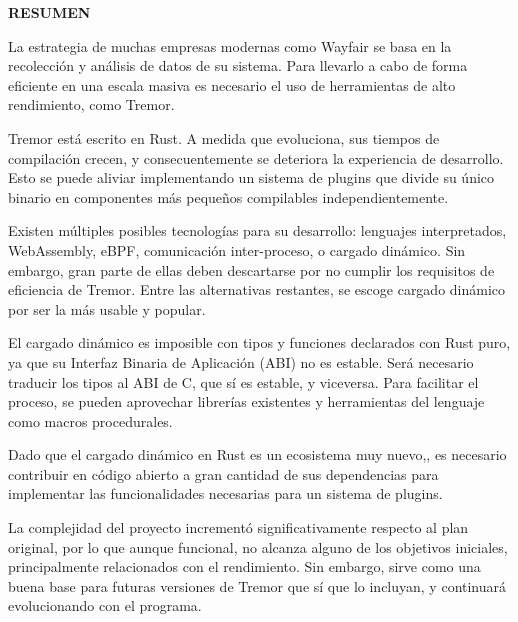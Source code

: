
\begin{center}
{\LARGE \bfseries RESUMEN}

\vspace{2.5cm}
\end{center}

La estrategia de muchas empresas modernas como Wayfair se basa en la recolección
y análisis de datos de su sistema. Para llevarlo a cabo de forma eficiente en
una escala masiva es necesario el uso de herramientas de alto rendimiento, como
Tremor.

Tremor está escrito en Rust. A medida que evoluciona, sus tiempos de compilación
crecen, y consecuentemente se deteriora la experiencia de desarrollo. Esto se
puede aliviar implementando un sistema de plugins que divide su único binario en
componentes más pequeños compilables independientemente.

Existen múltiples posibles tecnologías para su desarrollo: lenguajes
interpretados, WebAssembly, eBPF, comunicación inter-proceso, o cargado
dinámico. Sin embargo, gran parte de ellas deben descartarse por no cumplir los
requisitos de eficiencia de Tremor. Entre las alternativas restantes, se escoge
cargado dinámico por ser la más usable y popular.

El cargado dinámico es imposible con tipos y funciones declarados con Rust puro,
ya que su Interfaz Binaria de Aplicación (ABI) no es estable. Será necesario
traducir los tipos al ABI de C, que sí es estable, y viceversa. Para facilitar
el proceso, se pueden aprovechar librerías existentes y herramientas del
lenguaje como macros procedurales.

Dado que el cargado dinámico en Rust es un ecosistema muy nuevo,, es necesario
contribuir en código abierto a gran cantidad de sus dependencias para
implementar las funcionalidades necesarias para un sistema de plugins.

La complejidad del proyecto incrementó significativamente respecto al plan
original, por lo que aunque funcional, no alcanza alguno de los objetivos
iniciales, principalmente relacionados con el rendimiento. Sin embargo, sirve
como una buena base para futuras versiones de Tremor que sí que lo incluyan,
y continuará evolucionando con el programa.
